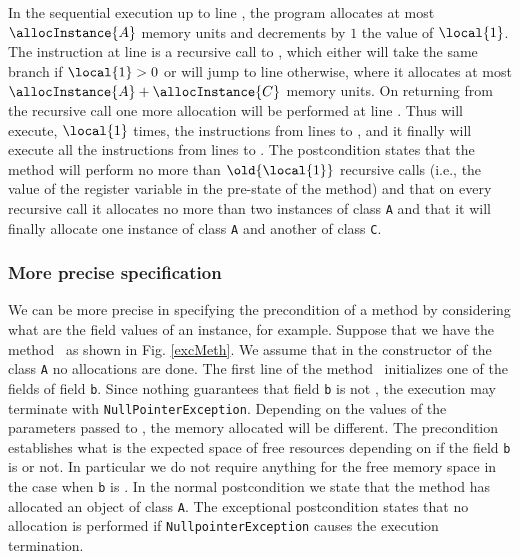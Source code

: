 In the sequential execution up to line , the program allocates at most $\allocInstance{A}$ memory units and decrements by $1$ the value of $\local{1}$. The instruction at line  is a recursive call to \methodd{}, which either will take the same branch if $\local{1} > 0 $ or will jump to line  otherwise, where it allocates at most $\allocInstance{A} +  \allocInstance{C}$ memory units. On returning from the recursive call one more allocation will be performed at line .
 Thus \methodd{} will execute, $\local{1}$ times, the instructions from lines  to , 
and it finally will execute all the instructions from lines   to .
The postcondition states that the method will perform no more
than $\old{\local{1}}$ recursive calls (i.e., the value of the register variable in the pre-state of the method) and that on every recursive call it allocates no more than two instances of class \texttt{A} and that it will finally allocate one instance of class \texttt{A} and another of class \texttt{C}.


\subsubsection{More precise specification} We can be more precise in specifying the precondition of a method by considering what are the field values of an instance, for example. Suppose that we have the method \method\ as shown in Fig. \ref{excMeth}. We assume that in the constructor of the class \texttt{A} no allocations are done. The first line of the method \method\ initializes one of the fields of field \texttt{b}. Since nothing guarantees that field \texttt{b} is not \Mynull, the execution may terminate with
\texttt{NullPointerException}. Depending on the values of the parameters passed to \method, the memory allocated will be different. The precondition establishes what is the expected space of free resources depending on if the field
\texttt{b} is \Mynull  or not. In particular we do not require anything for
the free memory space in the case when \texttt{b} is \Mynull. In the
normal postcondition we state that the method has allocated an
object of class \texttt{A}. The exceptional postcondition states
that no allocation is performed if \texttt{NullpointerException} causes the execution termination.

